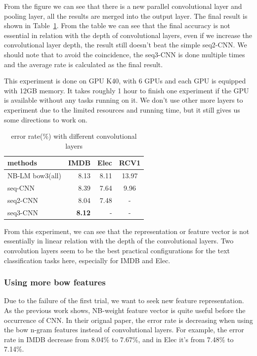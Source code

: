 From the figure we can see that there is a new parallel convolutional layer and pooling layer, all the
results are merged into the output layer. The final result is shown in Table~\ref{conv-table}. From
the table we can see that the final accuracy is not essential in relation with the depth of convolutional
layers, even if we increase the convolutional layer depth, the result still doesn't beat the simple
seq2-CNN. We should note that to avoid the coincidence, the seq3-CNN is done multiple times and the average
rate is calculated as the final result. 

This experiment is done on GPU K40, with 6 GPUs and each GPU is
equipped with 12GB memory. It takes roughly 1 hour to finish one experiment if the GPU is available without
any tasks running on it. We don't use other more layers to experiment due to the limited resources and running
time, but it still gives us some directions to work on.

\begin{table}
\begin{center}
\begin{tabular}{|l|r|r|c|}
\hline \bf methods & \bf IMDB & \bf Elec & \bf RCV1 \\ \hline
NB-LM bow3(all) & 8.13 & 8.11 & 13.97 \\
\hline seq-CNN & 8.39 & 7.64 & 9.96 \\
seq2-CNN & 8.04 & 7.48 & - \\
seq3-CNN & \textbf{8.12} & - & - \\
\hline
\end{tabular}
\end{center}
\caption{\label{conv-table} error rate(\%) with different convolutional layers}
\end{table}

From this experiment, we can see that the representation or feature vector is not essentially in linear relation
with the depth of the convolutional layers. Two convolution layers seem to be the best practical configurations
for the text classification tasks here, especially for IMDB and Elec.


\subsubsection{Using more bow features}
Due to the failure of the first trial, we want to seek new feature representation. As the previous work shows,
NB-weight feature vector is quite useful before the occurrence of CNN. In their orignal paper, the error rate
is decreasing when using the bow n-gram features instead of convolutional layers. For example, the error rate
in IMDB decrease from 8.04\% to 7.67\%, and in Elec it's from 7.48\% to 7.14\%.

